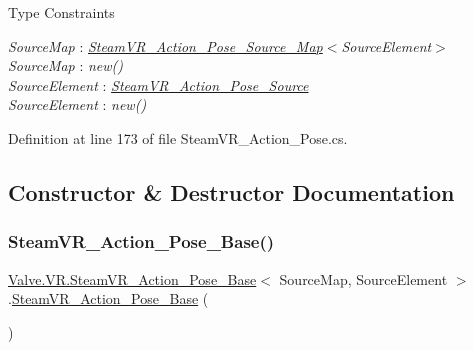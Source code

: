 \begin{Desc}
\item[Type Constraints]\begin{description}
\item[{\em Source\+Map} : {\em \mbox{\hyperlink{class_valve_1_1_v_r_1_1_steam_v_r___action___pose___source___map}{Steam\+V\+R\+\_\+\+Action\+\_\+\+Pose\+\_\+\+Source\+\_\+\+Map}}$<$Source\+Element$>$}]\item[{\em Source\+Map} : {\em new()}]\item[{\em Source\+Element} : {\em \mbox{\hyperlink{class_valve_1_1_v_r_1_1_steam_v_r___action___pose___source}{Steam\+V\+R\+\_\+\+Action\+\_\+\+Pose\+\_\+\+Source}}}]\item[{\em Source\+Element} : {\em new()}]\end{description}
\end{Desc}


Definition at line 173 of file Steam\+V\+R\+\_\+\+Action\+\_\+\+Pose.\+cs.



\subsection{Constructor \& Destructor Documentation}
\mbox{\label{class_valve_1_1_v_r_1_1_steam_v_r___action___pose___base_a6d6534444612fba63fc9723f86745168}} 
\subsubsection{\texorpdfstring{SteamVR\_Action\_Pose\_Base()}{SteamVR\_Action\_Pose\_Base()}}
{\footnotesize\ttfamily \mbox{\hyperlink{class_valve_1_1_v_r_1_1_steam_v_r___action___pose___base}{Valve.\+V\+R.\+Steam\+V\+R\+\_\+\+Action\+\_\+\+Pose\+\_\+\+Base}}$<$ Source\+Map, Source\+Element $>$.\mbox{\hyperlink{class_valve_1_1_v_r_1_1_steam_v_r___action___pose___base}{Steam\+V\+R\+\_\+\+Action\+\_\+\+Pose\+\_\+\+Base}} (\begin{DoxyParamCaption}{ }\end{DoxyParamCaption})}



